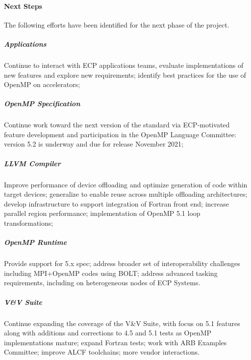 
\paragraph{Next Steps}
The following efforts have been identified for the next phase of the project.
\subparagraph{Applications} Continue to interact with ECP applications teams, evaluate implementations of new features and explore new requirements; identify best practices for the use of OpenMP on accelerators;

\subparagraph{OpenMP Specification} Continue work toward the next version of the standard via ECP-motivated feature development and participation in the OpenMP Language Committee: version 5.2 is underway and due for release November 2021;

\subparagraph{LLVM Compiler} Improve performance of device offloading and optimize generation of code within target devices; generalize to enable reuse across multiple offloading architectures; develop infrastructure to support integration of Fortran front end; increase parallel region performance; implementation of OpenMP 5.1 loop transformations;

\subparagraph{OpenMP Runtime} Provide support for 5.x spec; address broader set of interoperability challenges including MPI+OpenMP codes using BOLT; address advanced tasking requirements, including on heterogeneous nodes of ECP Systems.

\subparagraph{V\&V Suite} Continue expanding the coverage of the V\&V Suite, with focus on 5.1 features along with additions and corrections to 4.5 and 5.1 tests as OpenMP implementations mature; expand Fortran tests; work with ARB Examples Committee; improve ALCF toolchains; more vendor interactions.

